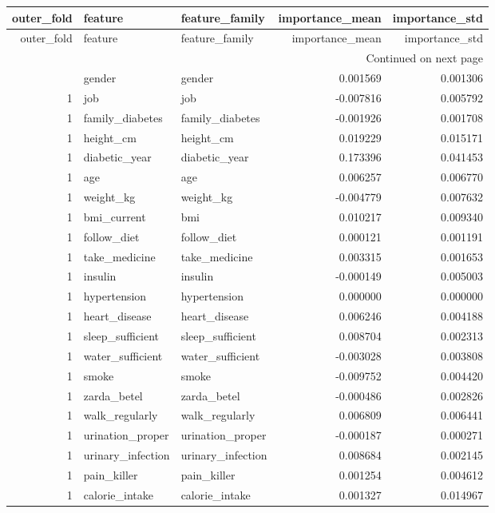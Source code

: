 \begin{longtable}{rllrr}
\toprule
outer\_fold & feature & feature\_family & importance\_mean & importance\_std \\
\midrule
\endfirsthead
\toprule
outer\_fold & feature & feature\_family & importance\_mean & importance\_std \\
\midrule
\endhead
\midrule
\multicolumn{5}{r}{Continued on next page} \\
\midrule
\endfoot
\bottomrule
\endlastfoot
1 & gender & gender & 0.001569 & 0.001306 \\
1 & job & job & -0.007816 & 0.005792 \\
1 & family\_diabetes & family\_diabetes & -0.001926 & 0.001708 \\
1 & height\_cm & height\_cm & 0.019229 & 0.015171 \\
1 & diabetic\_year & diabetic\_year & 0.173396 & 0.041453 \\
1 & age & age & 0.006257 & 0.006770 \\
1 & weight\_kg & weight\_kg & -0.004779 & 0.007632 \\
1 & bmi\_current & bmi & 0.010217 & 0.009340 \\
1 & follow\_diet & follow\_diet & 0.000121 & 0.001191 \\
1 & take\_medicine & take\_medicine & 0.003315 & 0.001653 \\
1 & insulin & insulin & -0.000149 & 0.005003 \\
1 & hypertension & hypertension & 0.000000 & 0.000000 \\
1 & heart\_disease & heart\_disease & 0.006246 & 0.004188 \\
1 & sleep\_sufficient & sleep\_sufficient & 0.008704 & 0.002313 \\
1 & water\_sufficient & water\_sufficient & -0.003028 & 0.003808 \\
1 & smoke & smoke & -0.009752 & 0.004420 \\
1 & zarda\_betel & zarda\_betel & -0.000486 & 0.002826 \\
1 & walk\_regularly & walk\_regularly & 0.006809 & 0.006441 \\
1 & urination\_proper & urination\_proper & -0.000187 & 0.000271 \\
1 & urinary\_infection & urinary\_infection & 0.008684 & 0.002145 \\
1 & pain\_killer & pain\_killer & 0.001254 & 0.004612 \\
1 & calorie\_intake & calorie\_intake & 0.001327 & 0.014967 \\

\end{longtable}
